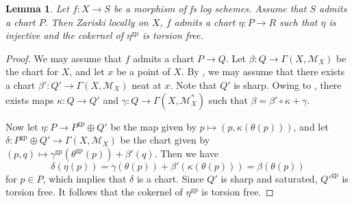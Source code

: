 \documentclass[10pt]{amsart}
\newtheorem{lem}[thm]{Lemma}
\theoremstyle{definition}
\theoremstyle{remark}
\numberwithin{equation}{subsection}
\newcommand{\cM}{\mathcal{M}}
\newcommand{\gp}{\mathrm{gp}}
\begin{document}
\begin{lem}
\label{loc.21}
Let $f\colon X\to S$ be a morphism of fs log schemes.
Assume that $S$ admits a chart $P$.
Then Zariski locally on $X$, $f$ admits a chart $\eta\colon P\to R$ such that $\eta$ is injective and the cokernel of $\eta^\gp$ is torsion free.
\end{lem}
\begin{proof}
We may assume that $f$ admits a chart $P\to Q$.
Let $\beta\colon Q\to \Gamma(X,\cM_X)$ be the chart for $X$, and let $x$ be a point of $X$.
By \cite[Proposition II.2.3.7]{Ogu}, we may assume that there exists a chart $\beta'\colon Q'\to \Gamma(X,\cM_X)$ neat at $x$.
Note that $Q'$ is sharp.
Owing to \cite[Proposition II.2.3.9]{Ogu}, there exists maps $\kappa \colon Q\to Q'$ and $\gamma \colon Q \to \Gamma(X,\cM_X^*)$ such that $\beta=\beta'\circ \kappa+\gamma$.

Now let $\eta\colon P\to P^\gp \oplus Q'$ be the map given by $p\mapsto (p,\kappa(\theta(p)))$, and let $\delta\colon P^\gp \oplus Q'\to \Gamma(X,\cM_X)$ be the chart given by $(p,q)\mapsto \gamma^\gp( \theta^\gp(p)) + \beta'(q)$.
Then we have
\[
\delta(\eta(p))
=
\gamma(\theta(p)) + \beta'(\kappa(\theta(p)))
=
\beta(\theta(p))
\]
for $p\in P$, which implies that $\delta$ is a chart.
Since $Q'$ is sharp and saturated, $Q'^\gp$ is torsion free.
It follows that the cokernel of $\eta^\gp$ is torsion free.
\end{proof}
\end{document}
